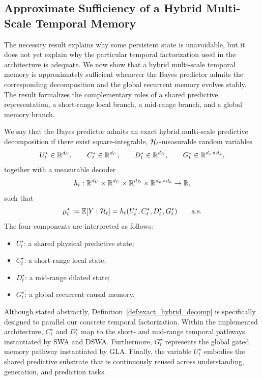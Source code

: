 \subsection{Approximate Sufficiency of a Hybrid Multi-Scale Temporal Memory}
\label{subsec:kairos_sufficiency}

The necessity result explains why some persistent state is unavoidable, but it does not yet explain why the particular temporal factorization used in the architecture is adequate. We now show that a hybrid multi-scale temporal memory is approximately sufficient whenever the Bayes predictor admits the corresponding decomposition and the global recurrent memory evolves stably. The result formalizes the complementary roles of a shared predictive representation, a short-range local branch, a mid-range branch, and a global memory branch.

\begin{definition}
\label{def:exact_hybrid_decomp}
We say that the Bayes predictor admits an exact hybrid multi-scale predictive decomposition if there exist square-integrable, $\mathcal{H}_t$-measurable random variables
\[
U_t^\star \in \mathbb{R}^{d_U},
\qquad
C_t^\star \in \mathbb{R}^{d_C},
\qquad
D_t^\star \in \mathbb{R}^{d_D},
\qquad
G_t^\star \in \mathbb{R}^{d_v \times d_k},
\]
together with a measurable decoder
\[
h_t:\mathbb{R}^{d_U}\times\mathbb{R}^{d_C}\times\mathbb{R}^{d_D}\times\mathbb{R}^{d_v\times d_k}\to\mathbb{R},
\]
such that
\begin{equation}
\mu_t^\star := \mathbb{E}[Y\mid \mathcal{H}_t] = h_t(U_t^\star,C_t^\star,D_t^\star,G_t^\star)
\qquad \text{a.s.}
\label{eq:exact_decomposition}
\end{equation}
The four components are interpreted as follows:
\begin{itemize}
    \item $U_t^\star$: a shared physical predictive state;
    \item $C_t^\star$: a short-range local state;
    \item $D_t^\star$: a mid-range dilated state;
    \item $G_t^\star$: a global recurrent causal memory.
\end{itemize}
\end{definition}


\begin{remark}
\label{rem:architecture_correspondence}
Although stated abstractly, Definition~\ref{def:exact_hybrid_decomp} is specifically designed to parallel our concrete temporal factorization. Within the implemented architecture, $C_t^\star$ and $D_t^\star$ map to the short- and mid-range temporal pathways instantiated by SWA and DSWA. Furthermore, $G_t^\star$ represents the global gated memory pathway instantiated by GLA. Finally, the variable $U_t^\star$ embodies the shared predictive substrate that is continuously reused across understanding, generation, and prediction tasks.
\end{remark}




